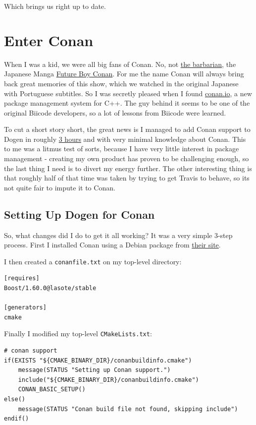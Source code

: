 \documentclass{book}
\begin{document}
Which brings us right up to date.

\section*{Enter Conan}
\label{sec-3}

When I was a kid, we were all big fans of Conan. No, not \href{https://en.wikipedia.org/wiki/Conan_the_Barbarian}{the
barbarian}, the Japanese Manga \href{https://en.wikipedia.org/wiki/Future_Boy_Conan}{Future Boy Conan}. For me the name Conan
will always bring back great memories of this show, which we watched
in the original Japanese with Portuguese subtitles. So I was secretly
pleased when I found \href{https://www.conan.io/}{conan.io}, a new package management system for
C++. The guy behind it seems to be one of the original Biicode
developers, so a lot of lessons from Biicode were learned.

To cut a short story short, the great news is I managed to add Conan
support to Dogen in roughly \href{https://github.com/DomainDrivenConsulting/dogen/blob/master/doc/agile/sprint_backlog_77.org#add-support-for-conanio}{3 hours} and with very minimal knowledge
about Conan. This to me was a litmus test of sorts, because I have
very little interest in package management - creating my own product
has proven to be challenging enough, so the last thing I need is to
divert my energy further. The other interesting thing is that roughly
half of that time was taken by trying to get Travis to behave, so its
not quite fair to impute it to Conan.

\subsection*{Setting Up Dogen for Conan}
\label{sec-3-1}

So, what changes did I do to get it all working? It was a very simple
3-step process. First I installed Conan using a Debian package from
\href{https://www.conan.io/downloads}{their site}.

I then created a \texttt{conanfile.txt} on my top-level directory:

\begin{verbatim}
[requires]
Boost/1.60.0@lasote/stable

[generators]
cmake
\end{verbatim}

Finally I modified my top-level \texttt{CMakeLists.txt}:

\begin{verbatim}
# conan support
if(EXISTS "${CMAKE_BINARY_DIR}/conanbuildinfo.cmake")
    message(STATUS "Setting up Conan support.")
    include("${CMAKE_BINARY_DIR}/conanbuildinfo.cmake")
    CONAN_BASIC_SETUP()
else()
    message(STATUS "Conan build file not found, skipping include")
endif()
\end{verbatim}
\end{document}
